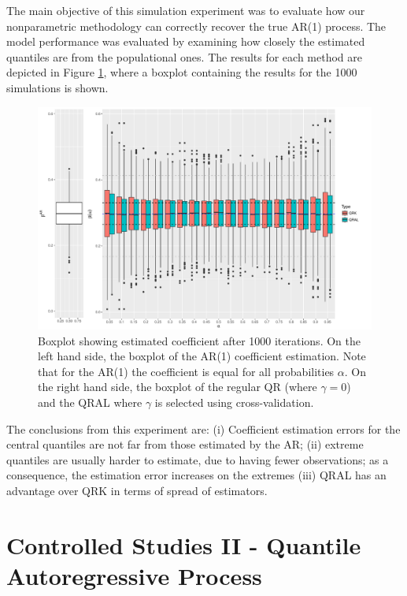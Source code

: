The main objective of this simulation experiment was to evaluate how our nonparametric methodology can correctly recover the true AR(1) process. The model performance was evaluated by examining how closely the estimated quantiles are from the populational ones. The results for each method are depicted in Figure \ref{fig:boxplot-ar1}, where a boxplot containing the results for the 1000 simulations is shown. %
\begin{figure}[h]
	\centering
	\centerline{\includegraphics[width=7in]{Images/boxplot-ar1.pdf}}
	\caption{Boxplot showing estimated coefficient after 1000 iterations. On the left hand side, the boxplot of the AR(1) coefficient estimation. Note that for the AR(1) the coefficient is equal for all probabilities $\alpha$. On the right hand side, the boxplot of the regular QR (where $\gamma = 0$) and the QRAL where $\gamma$ is selected using cross-validation. }
	\label{fig:boxplot-ar1}
\end{figure}
The conclusions from this experiment are: (i) Coefficient estimation errors for the central quantiles are not far from those estimated by the AR; (ii) extreme quantiles are usually harder to estimate, due to having fewer observations; as a consequence, the estimation error increases on the extremes (iii) QRAL has an advantage over QRK in terms of spread of estimators.


\section{Controlled Studies II - Quantile Autoregressive Process} \label{sec:qar-study}

